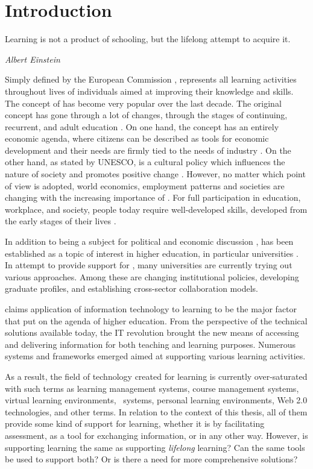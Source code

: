 \chapter{Introduction\label{cha:intro}}
\epigraph{Learning is not a product of schooling, but the lifelong attempt to
acquire it.}{\textit{Albert Einstein}}
\noindent

Simply defined by the European Commission \citeyearpar{EuropeanCommission2000},
\LLLs represents all learning activities throughout lives of individuals aimed
at improving their knowledge and skills. The concept of \LLLs has become very
popular over the last decade. The original concept has gone through a lot of
changes, through the stages of continuing, recurrent, and adult education
\citep{Jarvis2004}. On one hand, the \LLLs concept has an entirely economic
agenda, where citizens can be described as tools for economic development and
their needs are firmly tied to the needs of industry
\citep[pp.~112-114]{Carter2008}. On the other hand, as stated by UNESCO, \LLLs
is a cultural policy which influences the nature of society and promotes
positive change \citep[pp.~12-14]{Boshier2000}. However, no matter which point
of view is adopted, world economics, employment patterns and societies are
changing with the increasing importance of \LLLs
\citep{Jarvis2008,Simmons-McDonald2009}. For full participation in education,
workplace, and society, people today require well-developed \LLLs skills,
developed from the early stages of their lives \citep{Otala1997}.

In addition to being a subject for political and economic discussion
\citep{Bagnall2009}, \LLLs has been established as a topic of interest in
higher education, in particular universities \citep{Knapper2000}. In attempt to
provide support for \LLLsn, many universities are currently trying out various
approaches. Among these are changing institutional policies, developing graduate
profiles, and establishing cross-sector collaboration models.

\citet{Duke2001} claims application of information technology to learning to be
the major factor that put \LLLs on the agenda of higher education. From the
perspective of the technical solutions available today, the IT revolution
brought the new means of accessing and delivering information for both teaching
and learning purposes. Numerous systems and frameworks emerged aimed at
supporting various learning activities. 

As a result, the field of technology created for learning is currently
over-saturated with such terms as learning management systems, course management
systems, virtual learning environments, \ep~systems, personal learning
environments, Web 2.0 technologies, and other terms. In relation to the context
of this thesis, all of them provide some kind of support for learning, whether
it is by facilitating assessment, as a tool for exchanging information, or in
any other way. However, is supporting learning the same as supporting
\textit{lifelong} learning? Can the same tools be used to support both? Or is
there a need for more comprehensive solutions?

